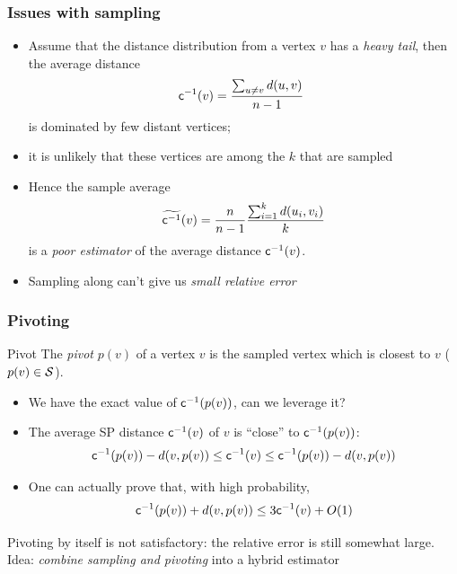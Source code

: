 \begin{frame}
  \frametitle{Issues with sampling}
  \begin{itemize}
    \item Assume that the distance distribution from a vertex $v$ has a
      \emph{heavy tail}, then the average distance
      \[
        \mathsf{c}^{-1}(v)=\frac{\sum_{u\neq v}d(u,v)}{n-1}\enspace
      \]
      is dominated by few distant vertices;
    \pause
    \item it is unlikely that these vertices are among the $k$ that are sampled
    \item Hence the sample average
      \[
        \widetilde{\mathsf{c}^{-1}}(v)=\frac{n}{n-1}\frac{\sum_{i=1}^k
        d(u_i,v_i)}{k}
      \]
      is a \emph{poor estimator} of the average distance $\mathsf{c}^{-1}(v)$.
    \pause
    \item Sampling along can't give us \emph{small relative error}
  \end{itemize}
\end{frame}

\begin{frame}
  \frametitle{Pivoting}
  \begin{definition}{Pivot}
    The \emph{pivot} $p(v)$ of a vertex $v$ is the sampled vertex which is
    closest to $v$ ($p(v)\in{\cal S}$).
  \end{definition}
  \begin{itemize}
    \item We have the exact value of $\mathsf{c}^{-1}(p(v))$, can we leverage
      it?
    \pause
    \item The average SP distance $\mathsf{c}^{-1}(v)$ of $v$ is ``close'' to
      $\mathsf{c}^{-1}(p(v))$:
      \[
        \mathsf{c}^{-1}(p(v))-d(v,p(v)) \le \mathsf{c}^{-1}(v) \le \mathsf{c}^{-1}(p(v))-d(v,p(v))
      \]
    \vspace{-20pt}
    \pause
    \item One can actually prove that, with high probability,
      \[
        \mathsf{c}^{-1}(p(v))+d(v,p(v))\le 3\mathsf{c}^{-1}(v)+O(1)
      \]
      \vspace{-20pt}
  \end{itemize}
  \pause
  Pivoting by itself is not satisfactory: the relative error is still somewhat
  large.
  \vfill
  \pause
  Idea: \emph{combine sampling and pivoting} into a hybrid estimator
\end{frame}

